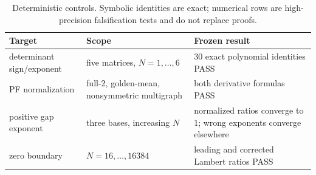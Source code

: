 \begin{table}[H]
\caption{Deterministic controls.  Symbolic identities are exact; numerical
rows are high-precision falsification tests and do not replace proofs.}
\label{tab:controls}
\centering
\small
\renewcommand{\arraystretch}{1.12}
\begin{tabularx}{\textwidth}{@{}>{\raggedright\arraybackslash}p{}
>{\raggedright\arraybackslash}p{}X@{}}
\toprule
Target & Scope & Frozen result \\
\midrule
determinant sign/exponent & five matrices, $N=1,\ldots,6$ & 30 exact polynomial identities PASS \\
PF normalization & full-2, golden-mean, nonsymmetric multigraph & both derivative formulas PASS \\
positive gap exponent & three bases, increasing $N$ & normalized ratios converge to $1$; wrong exponents converge elsewhere \\
zero boundary & $N=16,\ldots,16384$ & leading and corrected Lambert ratios PASS \\
\bottomrule
\end{tabularx}
\end{table}
